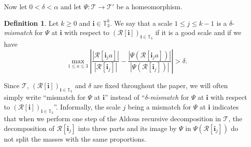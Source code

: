 \documentclass[11pt]{article}
\newcommand{\Tt}{\mathcal{T}}
\newcommand{\Rr}{\mathcal{R}}
\newcommand{\ii}{\mathbf{i}}
\theoremstyle{plain}
\theoremstyle{definition}
\newtheorem{definition}[theorem]{Definition}
\numberwithin{equation}{section}
\begin{document}
Now let $0<\delta<\alpha$ and let $\Psi: \Tt \to \Tt'$ be a homeomorphism.
\begin{definition}\label{defn_mismatch}
Let $k \geq 0$ and $\ii \in \mathbb{T}_3^k$. We say that a scale $1 \leq j \leq k-1$ is a $\delta$-\emph{mismatch} for $\Psi$ at $\ii$ with respect to $\left( \Rr[\ii] \right)_{\ii \in \mathbb{T}_3}$ if it is a good scale and if we have
\[ \max_{1 \leq a \leq 3} \left| \frac{\left| \Rr[\ii_j a] \right|}{\left| \Rr[\ii_j] \right|}-\frac{\left| \Psi \left( \Rr[\ii_j a] \right) \right|}{\left| \Psi \left( \Rr[\ii_j] \right) \right|} \right|>\delta. \]
\end{definition}
Since $\Tt$, $(\Rr[\ii])_{\ii \in \mathbb{T}_3}$ and $\delta$ are fixed throughout the paper, we will often simply write ``mismatch for $\Psi$ at $\ii$'' instead of ``$\delta$-\emph{mismatch} for $\Psi$ at $\ii$ with respect to $\left( \Rr[\ii] \right)_{\ii \in \mathbb{T}_3}$''.
Informally, the scale $j$ being a mismatch for $\Psi$ at $\ii$ indicates that when we perform one step of the Aldous recursive decomposition in $\Tt$, the decomposition of $\Rr[\ii_j]$ into three parts and its image by $\Psi$ in $\Psi \left( \Rr[\ii_j] \right)$ do not split the masses with the same proportions.
\end{document}
